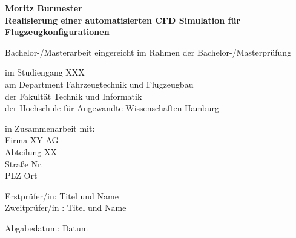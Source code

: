 
{\centering
\LARGE\textbf{Moritz Burmester\\
\bigskip
Realisierung einer
automatisierten CFD Simulation
für Flugzeugkonfigurationen}
}

\vfill
\normalsize
\begin{flushleft}

Bachelor-/Masterarbeit eingereicht im Rahmen der Bachelor-/Masterprüfung \newline

im Studiengang XXX\\
am Department Fahrzeugtechnik und Flugzeugbau\\
der Fakultät Technik und Informatik\\
der Hochschule für Angewandte Wissenschaften Hamburg \newline

in Zusammenarbeit mit:\\
Firma XY AG\\
Abteilung XX\\
Straße Nr.\\
PLZ Ort \newline

Erstprüfer/in: Titel und Name  \\
Zweitprüfer/in : Titel und Name \newline


Abgabedatum: Datum\\
    
\end{flushleft}
